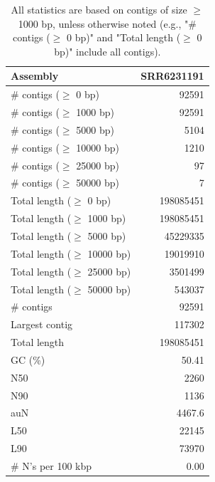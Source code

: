 \documentclass[12pt,a4paper]{article}
\begin{document}
\begin{table}[ht]
\begin{center}
\caption{All statistics are based on contigs of size $\geq$ 1000 bp, unless otherwise noted (e.g., "\# contigs ($\geq$ 0 bp)" and "Total length ($\geq$ 0 bp)" include all contigs).}
\begin{tabular}{|l*{1}{|r}|}
\hline
Assembly & SRR6231191 \\ \hline
\# contigs ($\geq$ 0 bp) & 92591 \\ \hline
\# contigs ($\geq$ 1000 bp) & 92591 \\ \hline
\# contigs ($\geq$ 5000 bp) & 5104 \\ \hline
\# contigs ($\geq$ 10000 bp) & 1210 \\ \hline
\# contigs ($\geq$ 25000 bp) & 97 \\ \hline
\# contigs ($\geq$ 50000 bp) & 7 \\ \hline
Total length ($\geq$ 0 bp) & 198085451 \\ \hline
Total length ($\geq$ 1000 bp) & 198085451 \\ \hline
Total length ($\geq$ 5000 bp) & 45229335 \\ \hline
Total length ($\geq$ 10000 bp) & 19019910 \\ \hline
Total length ($\geq$ 25000 bp) & 3501499 \\ \hline
Total length ($\geq$ 50000 bp) & 543037 \\ \hline
\# contigs & 92591 \\ \hline
Largest contig & 117302 \\ \hline
Total length & 198085451 \\ \hline
GC (\%) & 50.41 \\ \hline
N50 & 2260 \\ \hline
N90 & 1136 \\ \hline
auN & 4467.6 \\ \hline
L50 & 22145 \\ \hline
L90 & 73970 \\ \hline
\# N's per 100 kbp & 0.00 \\ \hline
\end{tabular}
\end{center}
\end{table}
\end{document}
